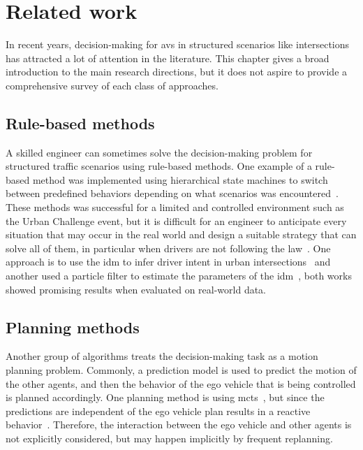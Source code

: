 \chapter{Related work}\label{ch:related_work}

In recent years, decision-making for \gls{av}s in structured scenarios like intersections has attracted a lot of attention in the literature. This chapter gives a broad introduction to the main research directions, but it does not aspire to provide a comprehensive survey of each class of approaches.

\section{Rule-based methods}
A skilled engineer can sometimes solve the decision-making problem for structured traffic scenarios using rule-based methods. One example of a rule-based method was implemented using hierarchical state machines to switch between predefined behaviors depending on what scenarios was encountered~\cite{Fletcher2008, darpa2008}. These methods was successful for a limited and controlled environment such as the Urban Challenge event, but it is difficult for an engineer to anticipate every situation that may occur in the real world and design a suitable strategy that can solve all of them, in particular when drivers are not following the law~\cite{Althoff2021}. 
One approach is to use the \gls{idm} \cite{idm2000} to infer driver intent in urban intersections~\citet{Liebner2012} and another used a particle filter to estimate the parameters of the \gls{idm}~\citet{Hoermann2017}, both works showed promising results when evaluated on real-world data. 


\section{Planning methods}
Another group of algorithms treats the decision-making task as a motion planning problem. Commonly, a prediction model is used to predict the motion of the other agents, and then the behavior of the ego vehicle that is being controlled is planned accordingly. One planning method is using \gls{mcts}~\cite{Browne2012}, but since the predictions are independent of the ego vehicle plan results in a reactive behavior~\cite{Hubmann2017, Sunberg2017}. Therefore, the interaction between the ego vehicle and other agents is not explicitly considered, but may happen implicitly by frequent replanning. %

